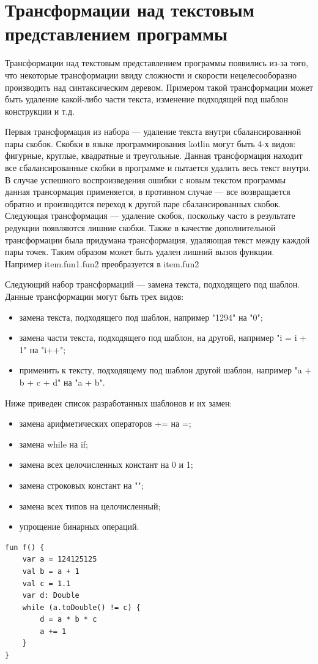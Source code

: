 \section{Трансформации над текстовым представлением программы}
Трансформации над текстовым представлением программы появились из-за того, что некоторые трансформации ввиду сложности и скорости нецелесооборазно производить над синтаксическим деревом. Примером такой трансформации может быть удаление какой-либо части текста, изменение подходящей под шаблон конструкции и т.д.

Первая трансформация из набора --- удаление текста внутри сбалансированной пары скобок. Скобки в языке программирования kotlin могут быть 4-х видов: фигурные, круглые, квадратные и треугольные. Данная трансформация находит все сбалансированные скобки в программе и пытается удалить весь текст внутри. В случае успешного воспроизведения ошибки с новым текстом программы данная трансормация применяется, в противном случае --- все возвращается обратно и производится переход к другой паре сбалансированных скобок. Следующая трансформация --- удаление скобок, поскольку часто в результате редукции появляются лишние скобки. Также в качестве дополнительной трансформации была придумана трансформация, удаляющая текст между каждой пары точек. Таким образом может быть удален лишний вызов функции. Например item.fun1.fun2 преобразуется в item.fun2

Следующий набор трансформаций --- замена текста, подходящего под шаблон. Данные трансформации могут быть трех видов:
\begin{itemize}
	\item замена текста, подходящего под шаблон, например "1294" на "0"; 
	\item замена части текста, подходящего под шаблон, на другой, например "i = i + 1" на "i++";
	\item применить к тексту, подходящему под шаблон другой шаблон, например "a + b + c + d" на "a + b".
\end{itemize}
Ниже приведен список разработанных шаблонов и их замен:
\begin{itemize}
	\item замена арифметических операторов += на =;
	\item замена while на if;
	\item замена всех целочисленных констант на 0 и 1;
	\item замена строковых констант на "";
	\item замена всех типов на целочисленный;
	\item упрощение бинарных операций.
\end{itemize}
\begin{lstlisting}
fun f() {
    var a = 124125125
    val b = a + 1
    val c = 1.1
    var d: Double
    while (a.toDouble() != c) {
        d = a * b * c
        a += 1
    }
}
\end{lstlisting}

